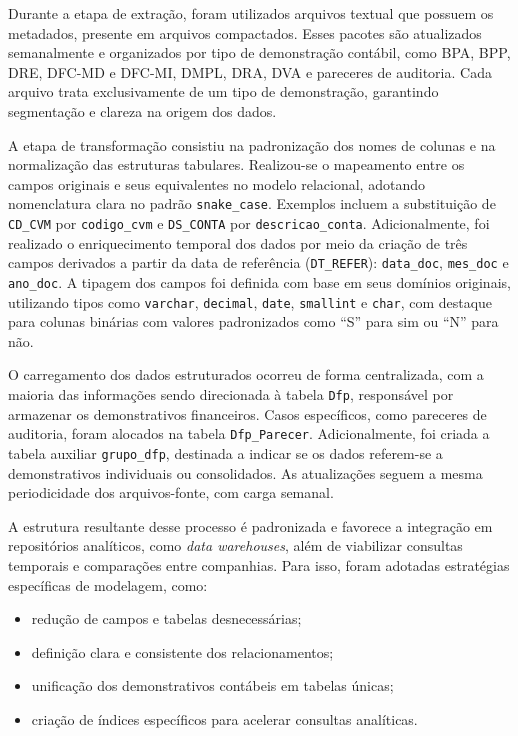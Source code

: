 Durante a etapa de extração, foram utilizados arquivos textual que possuem os metadados, presente em arquivos compactados. Esses pacotes são atualizados semanalmente e organizados por tipo de demonstração contábil, como BPA, BPP, DRE, DFC-MD e DFC-MI, DMPL, DRA, DVA e pareceres de auditoria. Cada arquivo trata exclusivamente de um tipo de demonstração, garantindo segmentação e clareza na origem dos dados.

A etapa de transformação consistiu na padronização dos nomes de colunas e na normalização das estruturas tabulares. Realizou-se o mapeamento entre os campos originais e seus equivalentes no modelo relacional, adotando nomenclatura clara no padrão \texttt{snake\_case}. Exemplos incluem a substituição de \texttt{CD\_CVM} por \texttt{codigo\_cvm} e \texttt{DS\_CONTA} por \texttt{descricao\_conta}. Adicionalmente, foi realizado o enriquecimento temporal dos dados por meio da criação de três campos derivados a partir da data de referência (\texttt{DT\_REFER}): \texttt{data\_doc}, \texttt{mes\_doc} e \texttt{ano\_doc}. A tipagem dos campos foi definida com base em seus domínios originais, utilizando tipos como \texttt{varchar}, \texttt{decimal}, \texttt{date}, \texttt{smallint} e \texttt{char}, com destaque para colunas binárias com valores padronizados como “S” para sim ou “N” para não.

O carregamento dos dados estruturados ocorreu de forma centralizada, com a maioria das informações sendo direcionada à tabela \texttt{Dfp}, responsável por armazenar os demonstrativos financeiros. Casos específicos, como pareceres de auditoria, foram alocados na tabela \texttt{Dfp\_Parecer}. Adicionalmente, foi criada a tabela auxiliar \texttt{grupo\_dfp}, destinada a indicar se os dados referem-se a demonstrativos individuais ou consolidados. As atualizações seguem a mesma periodicidade dos arquivos-fonte, com carga semanal.

A estrutura resultante desse processo é padronizada e favorece a integração em repositórios analíticos, como \textit{data warehouses}, além de viabilizar consultas temporais e comparações entre companhias. Para isso, foram adotadas estratégias específicas de modelagem, como: 

\begin{itemize}
	\item redução de campos e tabelas desnecessárias;
	\item definição clara e consistente dos relacionamentos;
	\item unificação dos demonstrativos contábeis em tabelas únicas;
	\item criação de índices específicos para acelerar consultas analíticas.
\end{itemize}

